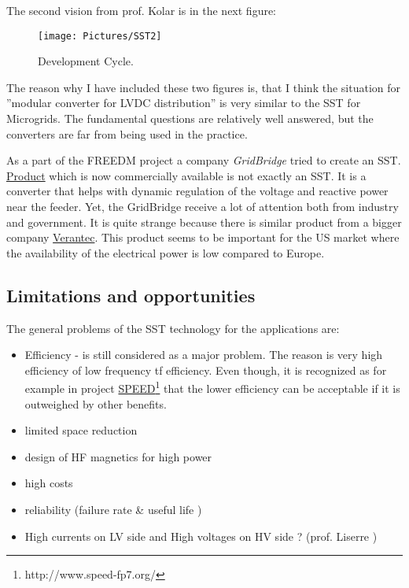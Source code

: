 \documentclass[]{scrartcl}
\begin{document}
The second vision from prof. Kolar is in the next figure:
\begin{figure}[h!]
	\centering
	\texttt{[image: Pictures/SST2]}
	\caption{Development Cycle.}
	\label{fig:SST2}
\end{figure}

The reason why I have included these two figures is, that I think the situation for ''modular converter for LVDC distribution'' is very similar to the SST for Microgrids. The fundamental questions are relatively well answered, but the converters are far from being used in the practice. 

As a part of the FREEDM project a company \emph{GridBridge} tried to create an SST. \href{<http://www.grid-bridge.com/products-2/>}{Product} which is now commercially available is not exactly an SST. It is a converter that helps with dynamic regulation of the voltage and reactive power near the feeder. Yet, the GridBridge receive a lot of attention both from industry and government. It is quite strange because there is similar product from a bigger company \href{<http://varentec.com/products/engo-v10/>}{Verantec}. This product seems to be important for the US market where the availability of the electrical power is low compared to Europe.

\newpage
\subsection{Limitations and opportunities}
The general problems of the SST technology for the applications are:
\begin{itemize}
	\item Efficiency - is still considered as a major problem. The reason is very high efficiency of low frequency tf efficiency. Even though, it is recognized as for example in project \href{<http://www.speed-fp7.org/>}{SPEED}\footnote{http://www.speed-fp7.org/} that the lower efficiency can be acceptable if it is outweighed by other benefits.
	
	\item limited space reduction 
	\item design of HF magnetics for high power
	\item high costs
	\item reliability (failure rate \& useful life )
	\item High currents on LV side and High voltages on HV side ? (prof. Liserre )
	
\end{itemize}
\end{document}
